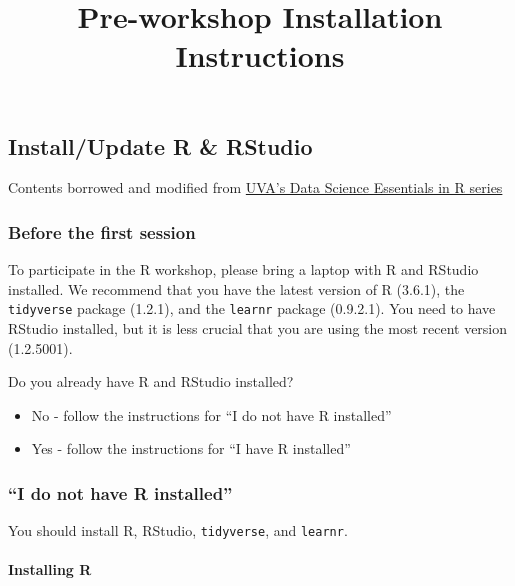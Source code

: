 \documentclass[]{article}
\title{Pre-workshop Installation Instructions}
\author{}
\date{}
\providecommand{\tightlist}{%
  \setlength{\itemsep}{0pt}\setlength{\parskip}{0pt}}
\let\oldparagraph\paragraph
\renewcommand{\paragraph}[1]{\oldparagraph{#1}\mbox{}}
\begin{document}
\maketitle

\hypertarget{installupdate-r-rstudio}{%
\subsection{Install/Update R \& RStudio}\label{installupdate-r-rstudio}}

Contents borrowed and modified from
\href{https://uvastatlab.github.io/phdplus/intror.html}{UVA's Data
Science Essentials in R series}

\hypertarget{before-the-first-session}{%
\subsubsection{Before the first
session}\label{before-the-first-session}}

To participate in the R workshop, please bring a laptop with R and
RStudio installed. We recommend that you have the latest version of R
(3.6.1), the \texttt{tidyverse} package (1.2.1), and the \texttt{learnr}
package (0.9.2.1). You need to have RStudio installed, but it is less
crucial that you are using the most recent version (1.2.5001).

Do you already have R and RStudio installed?

\begin{itemize}
\tightlist
\item
  No - follow the instructions for ``I do not have R installed''\\
\item
  Yes - follow the instructions for ``I have R installed''
\end{itemize}

\hypertarget{i-do-not-have-r-installed}{%
\subsubsection{``I do not have R
installed''}\label{i-do-not-have-r-installed}}

You should install R, RStudio, \texttt{tidyverse}, and \texttt{learnr}.

\hypertarget{installing-r}{%
\paragraph{Installing R}\label{installing-r}}
\end{document}
